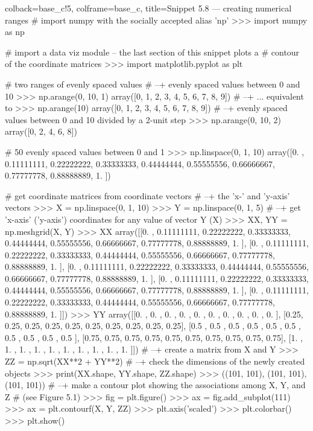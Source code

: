 \documentclass[a4paper,11pt]{book}
\begin{document}
\begin{pythoncode}[linenos=true,]{colback=base_c!5, colframe=base_c, title=\sffamily Snippet 5.8 --- creating numerical ranges}
# import numpy with the socially accepted alias 'np'
>>> import numpy as np

# import a data viz module -- the last section of this snippet plots a
# contour of the coordinate matrices
>>> import matplotlib.pyplot as plt

# two ranges of evenly spaced values
# --+ evenly spaced values between 0 and 10
>>> np.arange(0, 10, 1)
array([0, 1, 2, 3, 4, 5, 6, 7, 8, 9])
# --+ ... equivalent to
>>> np.arange(10)
array([0, 1, 2, 3, 4, 5, 6, 7, 8, 9])
# --+ evenly spaced values between 0 and 10 divided by a 2-unit step
>>> np.arange(0, 10, 2)
array([0, 2, 4, 6, 8])

# 50 evenly spaced values between 0 and 1
>>> np.linspace(0, 1, 10)
array([0.        , 0.11111111, 0.22222222, 0.33333333, 0.44444444,
       0.55555556, 0.66666667, 0.77777778, 0.88888889, 1.        ])

# get coordinate matrices from coordinate vectors 
# --+ the 'x-' and 'y-axis' vectors
>>> X = np.linspace(0, 1, 10)
>>> Y = np.linspace(0, 1, 5)
# --+ get 'x-axis' ('y-axis') coordinates for any value of vector Y (X)
>>> XX, YY = np.meshgrid(X, Y)
>>> XX 
array([[0.        , 0.11111111, 0.22222222, 0.33333333, 0.44444444,
        0.55555556, 0.66666667, 0.77777778, 0.88888889, 1.        ],
       [0.        , 0.11111111, 0.22222222, 0.33333333, 0.44444444,
        0.55555556, 0.66666667, 0.77777778, 0.88888889, 1.        ],
       [0.        , 0.11111111, 0.22222222, 0.33333333, 0.44444444,
        0.55555556, 0.66666667, 0.77777778, 0.88888889, 1.        ],
       [0.        , 0.11111111, 0.22222222, 0.33333333, 0.44444444,
        0.55555556, 0.66666667, 0.77777778, 0.88888889, 1.        ],
       [0.        , 0.11111111, 0.22222222, 0.33333333, 0.44444444,
        0.55555556, 0.66666667, 0.77777778, 0.88888889, 1.        ]])
>>> YY 
array([[0.  , 0.  , 0.  , 0.  , 0.  , 0.  , 0.  , 0.  , 0.  , 0.  ],
       [0.25, 0.25, 0.25, 0.25, 0.25, 0.25, 0.25, 0.25, 0.25, 0.25],
       [0.5 , 0.5 , 0.5 , 0.5 , 0.5 , 0.5 , 0.5 , 0.5 , 0.5 , 0.5 ],
       [0.75, 0.75, 0.75, 0.75, 0.75, 0.75, 0.75, 0.75, 0.75, 0.75],
       [1.  , 1.  , 1.  , 1.  , 1.  , 1.  , 1.  , 1.  , 1.  , 1.  ]])
# --+ create a matrix from X and Y 
>>> ZZ = np.sqrt(XX**2 + YY**2)
# --+ check the dimensions of the newly created objects 
>>> print(XX.shape, YY.shape, ZZ.shape)
>>> ((101, 101), (101, 101), (101, 101))
# --+ make a contour plot showing the associations among X, Y, and Z 
# (see Figure 5.1)
>>> fig = plt.figure()
>>> ax = fig.add_subplot(111)
>>> ax = plt.contourf(X, Y, ZZ)
>>> plt.axis('scaled')
>>> plt.colorbar()
>>> plt.show()
\end{pythoncode}
\end{document}
